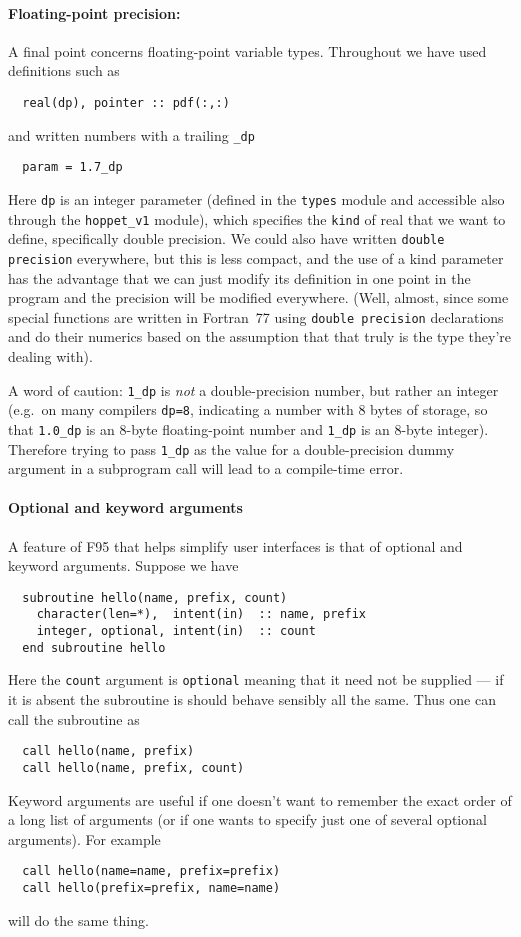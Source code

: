 \documentclass[12pt]{article}
\newcommand{\eg}{e.g.\ }
\newcommand{\ttt}[1]{\texttt{#1}}
\begin{document}
\paragraph{Floating-point precision:}
A final point concerns floating-point variable types. Throughout we
have used definitions such as
\begin{lstlisting}
  real(dp), pointer :: pdf(:,:)
\end{lstlisting}
and written numbers with a trailing \texttt{\_dp}
\begin{lstlisting}
  param = 1.7_dp
\end{lstlisting}
Here \texttt{dp} is an integer parameter (defined in the
\texttt{types} module and accessible also through the
\texttt{hoppet\_v1} module), which specifies the \texttt{kind} of real
that we want to define, specifically double precision. We could also
have written \texttt{double precision} everywhere, but this is less
compact, and the use of a kind parameter has the advantage that we
can just modify its definition in one point in the program and the
precision will be modified everywhere. (Well, almost, since some
special functions are written in Fortran~77 using \texttt{double
  precision} declarations and do their numerics based on the
assumption that that truly is the type they're dealing with).

A word of caution: \ttt{1\_dp} is \emph{not} a double-precision
number, but rather an integer (\eg on many compilers \ttt{dp=8},
indicating a number with 8 bytes of storage, so that \ttt{1.0\_dp} is
an 8-byte floating-point number and \ttt{1\_dp} is an 8-byte integer).
%
Therefore trying to pass \ttt{1\_dp} as the value for a
double-precision dummy argument in a subprogram call will lead to a
compile-time error.

\paragraph{Optional and keyword arguments}

A feature of F95 that helps simplify user interfaces is that of
optional and keyword arguments. Suppose we have
\begin{lstlisting}
  subroutine hello(name, prefix, count)
    character(len=*),  intent(in)  :: name, prefix
    integer, optional, intent(in)  :: count
  end subroutine hello
\end{lstlisting}
Here the \ttt{count} argument is \ttt{optional} meaning that it need
not be supplied --- if it is absent the subroutine is should behave
sensibly all the same. Thus one can call the subroutine as
\begin{lstlisting}
  call hello(name, prefix)
  call hello(name, prefix, count)
\end{lstlisting}
Keyword arguments are useful if one doesn't want to remember the exact
order of a long list of arguments (or if one wants to specify just one
of several optional arguments). For example
\begin{lstlisting}
  call hello(name=name, prefix=prefix)
  call hello(prefix=prefix, name=name)
\end{lstlisting}
will do the same thing.



%



\end{document}
